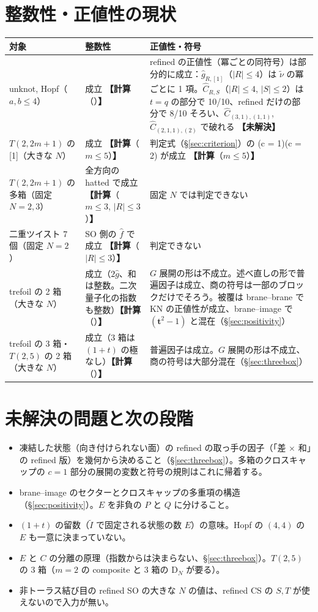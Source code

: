 \documentclass[a4paper,10pt]{ltjsarticle}
\newcommand{\bt}{\bm{t}}
\newcommand{\tnu}{\tilde\nu}
\newcommand{\comp}[1]{\textbf{【計算}\if\relax\detokenize{#1}\relax\else（#1）\fi\textbf{】}}
\newcommand{\open}{\textbf{【未解決】}}
\begin{document}
\section{整数性・正値性の現状}
\begin{center}
\begin{tabular}{p{3.2cm}p{3.6cm}p{8.2cm}}
\toprule
対象 & 整数性 & 正値性・符号 \\
\midrule
unknot, Hopf（$a, b \le 4$） & 成立 \comp{} & refined の正値性（冪ごとの同符号）は部分的に成立：$\hat g_{R,[1]}$（$|R| \le 4$）は $\tnu$ の冪ごとに 1 項。$\hat C_{R,S}$（$|R| \le 4$, $|S| \le 2$）は $t = q$ の部分で 10/10、refined だけの部分で 8/10 そろい、$\hat C_{(3,1),(1,1)}$, $\hat C_{(2,1,1),(2)}$ で破れる \open \\
$T(2,2m+1)$ の [1]（大きな $N$） & 成立 \comp{$m \le 5$} & 判定式（§\ref{sec:criterion}）の (c = 1)(c = 2) が成立 \comp{$m \le 5$} \\
$T(2,2m+1)$ の多箱（固定 $N = 2, 3$） & 全方向の hatted で成立 \comp{$m \le 3$, $|R| \le 3$} & 固定 $N$ では判定できない \\
二重ツイスト 7 個（固定 $N = 2$） & SO 側の $\hat f$ で成立 \comp{$|R| \le 3$} & 判定できない \\
trefoil の 2 箱（大きな $N$） & 成立（$2\hat g$、和は整数。二次量子化の指数も整数）\comp{} & $G$ 展開の形は不成立。述べ直しの形で普遍因子は成立、商の符号は一部のブロックだけでそろう。被覆は brane--brane で KN の正値性が成立、brane--image で $(\bt^2-1)$ と混在（§\ref{sec:positivity}） \\
trefoil の 3 箱・$T(2,5)$ の 2 箱（大きな $N$） & 成立（3 箱は $(1+t)$ の極なし）\comp{} & 普遍因子は成立。$G$ 展開の形は不成立、商の符号は大部分混在（§\ref{sec:threebox}） \\
\bottomrule
\end{tabular}
\end{center}

\section{未解決の問題と次の段階}
\begin{itemize}
\item 凍結した状態（向き付けられない面）の refined の取っ手の因子（「差 $\times$ 和」の refined 版）を幾何から決めること（§\ref{sec:threebox}）。多箱のクロスキャップの $c = 1$ 部分の展開の変数と符号の規則はこれに帰着する。
\item brane--image のセクターとクロスキャップの多重項の構造（§\ref{sec:positivity}）。$E$ を非負の $P$ と $Q$ に分けること。
\item $(1+t)$ の留数（$\tilde I$ で固定される状態の数 $E$）の意味。Hopf の $(4,4)$ の $E$ も一意に決まっていない。
\item $E$ と $C$ の分離の原理（指数からは決まらない、§\ref{sec:threebox}）。$T(2,5)$ の 3 箱（$m = 2$ の composite と 3 箱の D$_N$ が要る）。
\item 非トーラス結び目の refined SO の大きな $N$ の値は、refined CS の $S, T$ が使えないので入力が無い。
\end{itemize}
\end{document}
